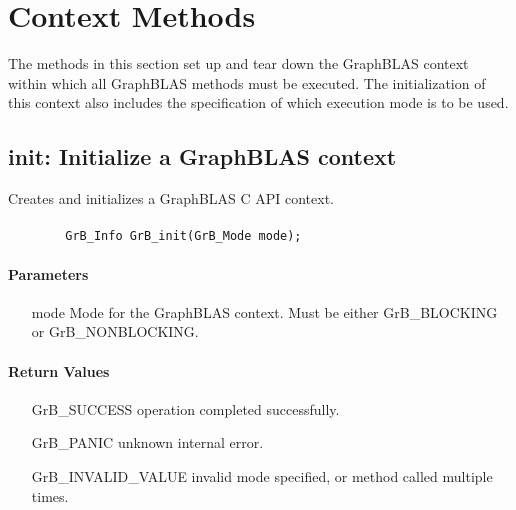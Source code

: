 \section{Context Methods}

The methods in this section set up and tear down the GraphBLAS
context within which all GraphBLAS methods must be executed.  The initialization
of this context also includes the specification of which execution mode is
to be used.

\subsection{{\sf init}: Initialize a GraphBLAS context}

Creates and initializes a GraphBLAS C API context.

\paragraph{\syntax}

\begin{verbatim}
        GrB_Info GrB_init(GrB_Mode mode);
\end{verbatim}


\paragraph{Parameters}

\begin{itemize}[leftmargin=1.1in]
	\item[{\sf mode}] Mode for the GraphBLAS context. Must be either {\sf GrB\_BLOCKING} 
    or {\sf GrB\_NONBLOCKING}.
\end{itemize}

\paragraph{Return Values}


\begin{itemize}[leftmargin=2.1in]
\item[{\sf GrB\_SUCCESS}]           operation completed successfully.
\item[{\sf GrB\_PANIC}]             unknown internal error.  
\item[{\sf GrB\_INVALID\_VALUE}]    invalid mode specified, or method called multiple times.
\end{itemize}

